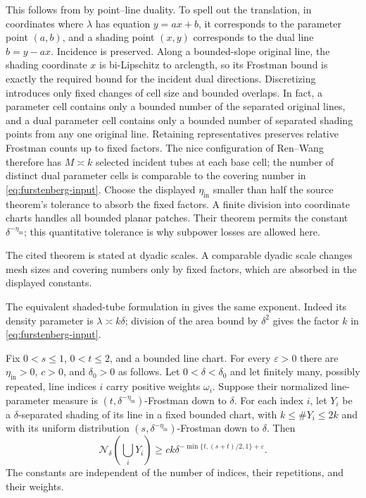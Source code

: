 This follows from \citet[Theorem~4.1 and Definitions~1.3, 2.3, 3.1]{RW2025}
by point--line duality. To spell out the translation, in coordinates
where $\lambda$ has equation $y=ax+b$, it corresponds to the
parameter point $(a,b)$, and a shading point $(x,y)$ corresponds to
the dual line $b=y-ax$. Incidence is preserved. Along a bounded-slope
original line, the shading coordinate $x$ is bi-Lipschitz to
arclength, so its Frostman bound is exactly the required bound for
the incident dual directions. Discretizing introduces only fixed
changes of cell size and bounded overlaps. In fact, a parameter
cell contains only a bounded number of the separated original
lines, and a dual parameter cell contains only a bounded number
of separated shading points from any one original line. Retaining
representatives preserves relative Frostman counts up to fixed
factors. The nice configuration of Ren--Wang therefore has
$M\asymp k$ selected incident tubes at each base cell; the number
of distinct dual parameter cells is comparable to the covering
number in \eqref{eq:furstenberg-input}. Choose the displayed
$\eta_{\mathrm{in}}$ smaller than half the source theorem's tolerance to absorb
the fixed factors. A finite division into coordinate
charts handles all bounded planar patches. Their theorem permits
the constant $\delta^{-\eta_{\mathrm{in}}}$; this quantitative tolerance is why
subpower losses are allowed here.

The cited theorem is stated at dyadic scales. A comparable dyadic
scale changes mesh sizes and covering numbers only by fixed factors,
which are absorbed in the displayed constants.

The equivalent shaded-tube formulation in
\citet[Theorem~0.6, Equation~(0.8)]{WW2024} gives the same exponent.
Indeed its density parameter is $\lambda\asymp k\delta$; division
of the area bound by $\delta^2$ gives the factor $k$ in
\eqref{eq:furstenberg-input}.

\begin{corollary}\label{cor:weighted-furstenberg}
Fix $0<s\le1$, $0<t\le2$, and a bounded line chart. For every
$\varepsilon>0$ there are $\eta_{\mathrm{in}}>0$, $c>0$, and $\delta_0>0$ as follows.
Let $0<\delta<\delta_0$ and let finitely many, possibly repeated,
line indices $i$ carry positive weights $\omega_i$. Suppose their
normalized line-parameter measure is
$(t,\delta^{-\eta_{\mathrm{in}}})$-Frostman down to $\delta$. For each index $i$,
let $Y_i$ be a $\delta$-separated shading of its line in a fixed
bounded chart, with $k\le\#Y_i\le2k$ and with its uniform
distribution $(s,\delta^{-\eta_{\mathrm{in}}})$-Frostman down to $\delta$. Then
\[
 \mathcal N_\delta\left(\bigcup_iY_i\right)
 \ge c k\delta^{-\min\{t,(s+t)/2,1\}+\varepsilon}.
\]
The constants are independent of the number of indices, their
repetitions, and their weights.
\end{corollary}


